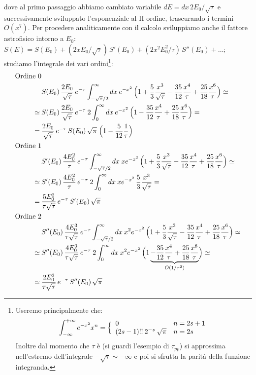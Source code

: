 dove al primo passaggio abbiamo cambiato variabile $dE = dx\,2E_0/\sqrt{\tau}$ e successivamente sviluppato l'esponenziale al II ordine, trascurando i termini $O(x^7)$. Per procedere analiticamente con il calcolo sviluppiamo anche il fattore astrofisico intorno a $E_0$: $S(E) = S(E_0) + (2xE_0/\sqrt{\tau})\,S'(E_0) + (2x^2E_0^2/\tau)\,S''(E_0)+\dots$; studiamo l'integrale dei vari ordini\footnote{Useremo principalmente che:
$$\int_{-\infty}^{+\infty} e^{-x^2} x^n = \Bigl \{ %
\begin{array}{ll}
    0 & n=2s+1 \\
    (2s-1)!!\:2^{-s} \: \sqrt{\pi} & n=2s
\end{array}%
$$%
Inoltre dal momento che $\tau$ è  (si guardi l'esempio di $\tau_{pp}$) si approssima nell'estremo dell'integrale $-\sqrt{\tau}\sim-\infty$ e poi si sfrutta la parità della funzione integranda.}:
\begin{displaymath}
\begin{aligned}
\text{Ordine 0}& \\
&S(E_0) \, \frac{2E_0}{\sqrt{\tau}}\,e^{-\tau} \int_{-\sqrt{\tau}/2}^\infty dx \:  e^{-x^2} \, \Bigl ( 1+\frac{5}{3} \frac{x^3}{\sqrt{\tau}} - \frac{35}{12}\frac{x^4}{\tau} + \frac{25}{18} \frac{x^6}{\tau} \Bigr )\simeq \\
\simeq\: &S(E_0) \, \frac{2E_0}{\sqrt{\tau}}\,e^{-\tau} \: 2\int_{0}^\infty dx \:  e^{-x^2} \, \Bigl ( 1- \frac{35}{12}\frac{x^4}{\tau} + \frac{25}{18} \frac{x^6}{\tau} \Bigr ) = \\
= \:&\frac{2E_0}{\sqrt{\tau}}\,e^{-\tau} \,S(E_0) \,\sqrt{\pi}\; \Bigl ( 1-\frac{5}{12}\frac{1}{\tau} \Bigr ) \\
\text{Ordine 1}& \\
&S'(E_0) \, \frac{4E_0^2}{\tau}\,e^{-\tau} \int_{-\sqrt{\tau}/2}^\infty dx \: x e^{-x^2} \, \Bigl ( 1+\frac{5}{3} \frac{x^3}{\sqrt{\tau}} - \frac{35}{12}\frac{x^4}{\tau} + \frac{25}{18} \frac{x^6}{\tau} \Bigr )\simeq \\
\simeq \:&S'(E_0) \, \frac{4E_0^2}{\tau}\,e^{-\tau} \:2\int_{0}^\infty dx \: x e^{-x^2} \, \frac{5}{3} \frac{x^3}{\sqrt{\tau}}= \\
=\:&\frac{5E_0^2}{\tau\sqrt{\tau}}\,e^{-\tau} \, S'(E_0) \,\sqrt{\pi} \\
\text{Ordine 2}& \\
&S''(E_0) \, \frac{4E_0^3}{\tau\sqrt{\tau}}\,e^{-\tau} \int_{-\sqrt{\tau}/2}^\infty dx \: x^2 e^{-x^2} \, \Bigl ( 1+\frac{5}{3} \frac{x^3}{\sqrt{\tau}} - \frac{35}{12}\frac{x^4}{\tau} + \frac{25}{18} \frac{x^6}{\tau} \Bigr )\simeq \\
\simeq\: &S''(E_0) \, \frac{4E_0^3}{\tau\sqrt{\tau}}\,e^{-\tau}\: 2 \int_{0}^\infty dx \: x^2 e^{-x^2} \, \Bigl ( 1 \underbrace{- \frac{35}{12}\frac{x^4}{\tau} + \frac{25}{18} \frac{x^6}{\tau}}_{O(1/\tau^2)} \Bigr )\simeq \\
\simeq \:&\frac{2E_0^3}{\tau\sqrt{\tau}}\,e^{-\tau}\,S''(E_0) \,\sqrt{\pi}
\end{aligned}
\end{displaymath}
